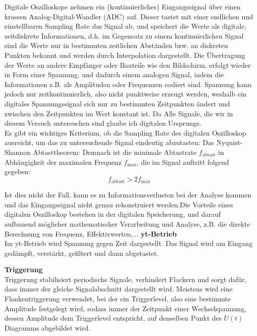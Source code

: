 Digitale Oszilloskope nehmen ein (kontinuierliches) Eingangssignal über einen krassen Analog-Digital-Wandler (ADC) auf. Dieser tastet mit einer endlichen und einstellbaren Sampling Rate das Signal ab, und speichert die Werte als digitale, zeitdiskrete Informationen, d.h. im Gegensatz zu einem kontinuierlichen Signal sind die Werte nur in bestimmten zeitlichen Abständen bzw. an diskreten Punkten bekannt und werden durch Interpolation dargestellt. Die Übertragung der Werte an andere Empfänger oder Bauteile wie den Bildschirm, erfolgt wieder in Form einer Spannung, und dadurch einem analogen Signal, indem die Informationen z.B. als Amplituden oder Frequenzen codiert sind. Spannung kann jedoch nur zeitkontinuierlich, also nicht punktweise erzeugt werden, weshalb ein digitales Spannungssignal sich nur zu bestimmten Zeitpunkten ändert und zwischen den Zeitpunkten im Wert konstant ist. Da  Alle Signale, die wir in diesem Versuch untersuchen sind glaube ich digitalen Ursprungs.\\Es gibt ein wichtiges Kriterium, ob die Sampling Rate des digitalen Oszilloskop ausreicht, um das zu untersuchende Signal eindeutig abzutasten: Das Nyquist-Shannon Abtasttheorem: Demnach ist die minimale Abtastrate \(f_{\text{abtast}}\) in Abhängigkeit der maximalen Frequenz \(f_{\text{max}}\), die im Signal auftritt folgend gegeben:
\begin{equation}
    f_{\text{abtast}}>2f_\text{max}
\end{equation}

Ist dies nicht der Fall, kann es zu Informationsverlusten bei der Analyse kommen und das Eingangssignal nicht genau rekonstruiert werden.Die Vorteile eines digitalen Oszilloskop bestehen in der digitalen Speicherung, und darauf aufbauend möglicher mathematischer Verarbeitung und Analyse, z.B. die direkte Berechnung von Frequenz, Effektivwerten,... 
\newpage
\textbf{yt-Betrieb}\\
Im yt-Betrieb wird Spannung gegen Zeit dargestellt. Das Signal wird am Eingang gedämpft, verstärkt, gefiltert und dann abgetastet.

\textbf{Triggerung}\\
Triggerung stabilisiert periodische Signale, verhindert Flackern und sorgt dafür, dass immer der gleiche Signalabschnitt dargestellt wird. Meistens wird eine Flankentriggerung verwendet, bei der ein Triggerlevel, also eine bestimmte Amplitude festgelegt wird, sodass immer der Zeitpunkt einer Wechselspannung, dessen Amplitude dem Triggerlevel entspricht, auf denselben Punkt des \(U(t)\) Diagramms abgebildet wird. 

